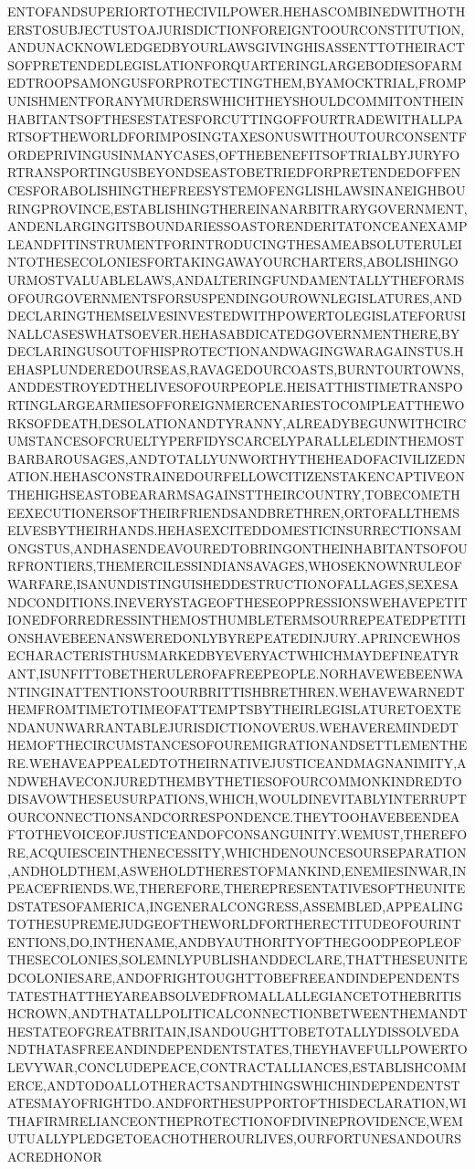 \documentclass[letterpaper]{article}
\begin{document}
ENTOFANDSUPERIORTOTHECIVILPOWER.HEHASCOMBINEDWITHOTHERSTOSUBJECTUSTOAJURISDICTIONFOREIGNTOOURCONSTITUTION,ANDUNACKNOWLEDGEDBYOURLAWSGIVINGHISASSENTTOTHEIRACTSOFPRETENDEDLEGISLATIONFORQUARTERINGLARGEBODIESOFARMEDTROOPSAMONGUSFORPROTECTINGTHEM,BYAMOCKTRIAL,FROMPUNISHMENTFORANYMURDERSWHICHTHEYSHOULDCOMMITONTHEINHABITANTSOFTHESESTATESFORCUTTINGOFFOURTRADEWITHALLPARTSOFTHEWORLDFORIMPOSINGTAXESONUSWITHOUTOURCONSENTFORDEPRIVINGUSINMANYCASES,OFTHEBENEFITSOFTRIALBYJURYFORTRANSPORTINGUSBEYONDSEASTOBETRIEDFORPRETENDEDOFFENCESFORABOLISHINGTHEFREESYSTEMOFENGLISHLAWSINANEIGHBOURINGPROVINCE,ESTABLISHINGTHEREINANARBITRARYGOVERNMENT,ANDENLARGINGITSBOUNDARIESSOASTORENDERITATONCEANEXAMPLEANDFITINSTRUMENTFORINTRODUCINGTHESAMEABSOLUTERULEINTOTHESECOLONIESFORTAKINGAWAYOURCHARTERS,ABOLISHINGOURMOSTVALUABLELAWS,ANDALTERINGFUNDAMENTALLYTHEFORMSOFOURGOVERNMENTSFORSUSPENDINGOUROWNLEGISLATURES,ANDDECLARINGTHEMSELVESINVESTEDWITHPOWERTOLEGISLATEFORUSINALLCASESWHATSOEVER.HEHASABDICATEDGOVERNMENTHERE,BYDECLARINGUSOUTOFHISPROTECTIONANDWAGINGWARAGAINSTUS.HEHASPLUNDEREDOURSEAS,RAVAGEDOURCOASTS,BURNTOURTOWNS,ANDDESTROYEDTHELIVESOFOURPEOPLE.HEISATTHISTIMETRANSPORTINGLARGEARMIESOFFOREIGNMERCENARIESTOCOMPLEATTHEWORKSOFDEATH,DESOLATIONANDTYRANNY,ALREADYBEGUNWITHCIRCUMSTANCESOFCRUELTYPERFIDYSCARCELYPARALLELEDINTHEMOSTBARBAROUSAGES,ANDTOTALLYUNWORTHYTHEHEADOFACIVILIZEDNATION.HEHASCONSTRAINEDOURFELLOWCITIZENSTAKENCAPTIVEONTHEHIGHSEASTOBEARARMSAGAINSTTHEIRCOUNTRY,TOBECOMETHEEXECUTIONERSOFTHEIRFRIENDSANDBRETHREN,ORTOFALLTHEMSELVESBYTHEIRHANDS.HEHASEXCITEDDOMESTICINSURRECTIONSAMONGSTUS,ANDHASENDEAVOUREDTOBRINGONTHEINHABITANTSOFOURFRONTIERS,THEMERCILESSINDIANSAVAGES,WHOSEKNOWNRULEOFWARFARE,ISANUNDISTINGUISHEDDESTRUCTIONOFALLAGES,SEXESANDCONDITIONS.INEVERYSTAGEOFTHESEOPPRESSIONSWEHAVEPETITIONEDFORREDRESSINTHEMOSTHUMBLETERMSOURREPEATEDPETITIONSHAVEBEENANSWEREDONLYBYREPEATEDINJURY.APRINCEWHOSECHARACTERISTHUSMARKEDBYEVERYACTWHICHMAYDEFINEATYRANT,ISUNFITTOBETHERULEROFAFREEPEOPLE.NORHAVEWEBEENWANTINGINATTENTIONSTOOURBRITTISHBRETHREN.WEHAVEWARNEDTHEMFROMTIMETOTIMEOFATTEMPTSBYTHEIRLEGISLATURETOEXTENDANUNWARRANTABLEJURISDICTIONOVERUS.WEHAVEREMINDEDTHEMOFTHECIRCUMSTANCESOFOUREMIGRATIONANDSETTLEMENTHERE.WEHAVEAPPEALEDTOTHEIRNATIVEJUSTICEANDMAGNANIMITY,ANDWEHAVECONJUREDTHEMBYTHETIESOFOURCOMMONKINDREDTODISAVOWTHESEUSURPATIONS,WHICH,WOULDINEVITABLYINTERRUPTOURCONNECTIONSANDCORRESPONDENCE.THEYTOOHAVEBEENDEAFTOTHEVOICEOFJUSTICEANDOFCONSANGUINITY.WEMUST,THEREFORE,ACQUIESCEINTHENECESSITY,WHICHDENOUNCESOURSEPARATION,ANDHOLDTHEM,ASWEHOLDTHERESTOFMANKIND,ENEMIESINWAR,INPEACEFRIENDS.WE,THEREFORE,THEREPRESENTATIVESOFTHEUNITEDSTATESOFAMERICA,INGENERALCONGRESS,ASSEMBLED,APPEALINGTOTHESUPREMEJUDGEOFTHEWORLDFORTHERECTITUDEOFOURINTENTIONS,DO,INTHENAME,ANDBYAUTHORITYOFTHEGOODPEOPLEOFTHESECOLONIES,SOLEMNLYPUBLISHANDDECLARE,THATTHESEUNITEDCOLONIESARE,ANDOFRIGHTOUGHTTOBEFREEANDINDEPENDENTSTATESTHATTHEYAREABSOLVEDFROMALLALLEGIANCETOTHEBRITISHCROWN,ANDTHATALLPOLITICALCONNECTIONBETWEENTHEMANDTHESTATEOFGREATBRITAIN,ISANDOUGHTTOBETOTALLYDISSOLVEDANDTHATASFREEANDINDEPENDENTSTATES,THEYHAVEFULLPOWERTOLEVYWAR,CONCLUDEPEACE,CONTRACTALLIANCES,ESTABLISHCOMMERCE,ANDTODOALLOTHERACTSANDTHINGSWHICHINDEPENDENTSTATESMAYOFRIGHTDO.ANDFORTHESUPPORTOFTHISDECLARATION,WITHAFIRMRELIANCEONTHEPROTECTIONOFDIVINEPROVIDENCE,WEMUTUALLYPLEDGETOEACHOTHEROURLIVES,OURFORTUNESANDOURSACREDHONOR
\end{document}
